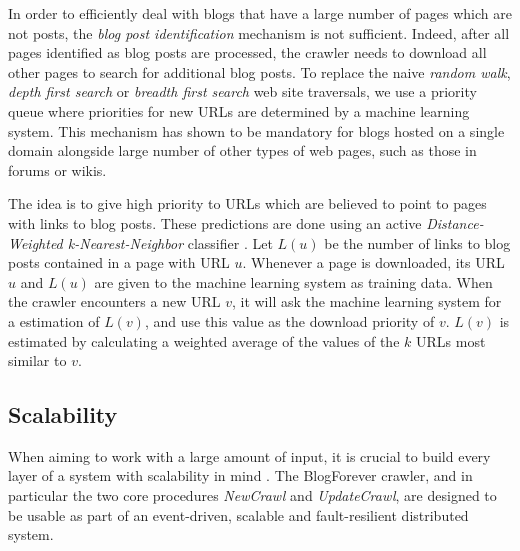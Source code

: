 In order to efficiently deal with blogs that have a large number of pages which are not posts, the \emph{blog post identification} mechanism is not sufficient. Indeed, after all pages identified as blog posts are processed, the crawler needs to download all other pages to search for additional blog posts. To replace the naive \emph{random walk}, \emph{depth first search} or \emph{breadth first search} web site traversals, we use a priority queue where priorities for new URLs are determined by a machine learning system. This mechanism has shown to be mandatory for blogs hosted on a single domain alongside large number of other types of web pages, such as those in forums or wikis.

The idea is to give high priority to URLs which are believed to point to pages with links to blog posts. These predictions are done using an active \emph{Distance-Weighted k-Nearest-Neighbor} classifier \cite{dudani1976}. Let $L(u)$ be the number of links to blog posts contained in a page with URL $u$. Whenever a page is downloaded, its URL $u$ and $L(u)$ are given to the machine learning system as training data. When the crawler encounters a new URL $v$, it will ask the machine learning system for a estimation of $L(v)$, and use this value as the download priority of $v$. $L(v)$ is estimated by calculating a weighted average of the values of the $k$ URLs most similar to $v$.

\subsection{Scalability}
When aiming to work with a large amount of input, it is crucial to build every layer of a system with scalability in mind \cite{thereactivemanifesto2013}. The BlogForever crawler, and in particular the two core procedures \emph{NewCrawl} and \emph{UpdateCrawl}, are designed to be usable as part of an event-driven, scalable and fault-resilient distributed system.

